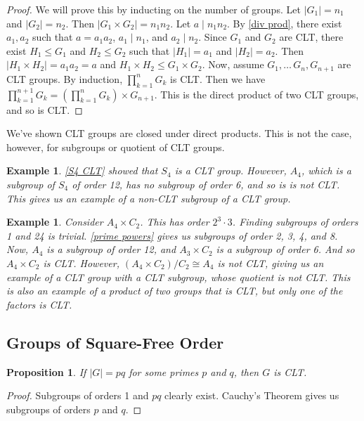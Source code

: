 \documentclass[12pt]{report}
\theoremstyle{newthm}
\newtheorem{Example}[lem]{Example}
\newtheorem{prop}[lem]{Proposition}
\begin{document}
\begin{proof}
We will prove this by inducting on the number of groups. Let $|G_1|=n_1$ and $|G_2|=n_2$. Then $|G_1\times G_2|=n_1n_2$. Let $a\mid n_1n_2$. By \cref{div prod}, there exist $a_1, a_2$ such that $a=a_1a_2$, $a_1\mid n_1$, and $a_2\mid n_2$. Since $G_1$ and $G_2$ are CLT, there exist $H_1\leq G_1$ and $H_2\leq G_2$ such that $|H_1|=a_1$ and $|H_2|=a_2$. Then $|H_1\times H_2| = a_1a_2=a$ and $H_1\times H_2\leq G_1\times G_2$. Now, assume $G_1,\dotsc\, G_n, G_{n+1}$ are CLT groups. By induction, $\prod\limits_{k=1}^{n}G_k$ is CLT. Then we have $\prod\limits_{k=1}^{n+1}G_k= (\prod\limits_{k=1}^n G_k)\times G_{n+1}$. This is the direct product of two CLT groups, and so is CLT. 
\end{proof}

We've shown CLT groups are closed under direct products. This is not the case, however, for subgroups or quotient of CLT groups.

\begin{Example}
\cref{S4 CLT} showed that $S_4$ is a CLT group. However, $A_4$, which is a subgroup of $S_4$ of order 12, has no subgroup of order 6, and so is is not CLT. This gives us an example of a non-CLT subgroup of a CLT group.
\end{Example}

\begin{Example}
Consider $A_4\times C_2$. This has order $2^3\cdot3$. Finding subgroups of orders 1 and 24 is trivial. \cref{prime powers} gives us subgroups of order 2, 3, 4, and 8. Now, $A_4$ is a subgroup of order 12, and $A_3\times C_2$ is a subgroup of order 6. And so $A_4\times C_2$ is CLT. However, $(A_4\times C_2)/C_2 \cong A_4$ is not CLT, giving us an example of a CLT group with a CLT subgroup, whose quotient is not CLT. This is also an example of a product of two groups that is CLT, but only one of the factors is CLT.
\end{Example}

\subsection{Groups of Square-Free Order}
\begin{prop}\label{pq clt} If $|G|=pq$ for some primes $p$ and $q$, then $G$ is CLT.
\end{prop}

\begin{proof}
Subgroups of orders 1 and $pq$ clearly exist. Cauchy's Theorem gives us subgroups of orders $p$ and $q$.
\end{proof}
\end{document}
